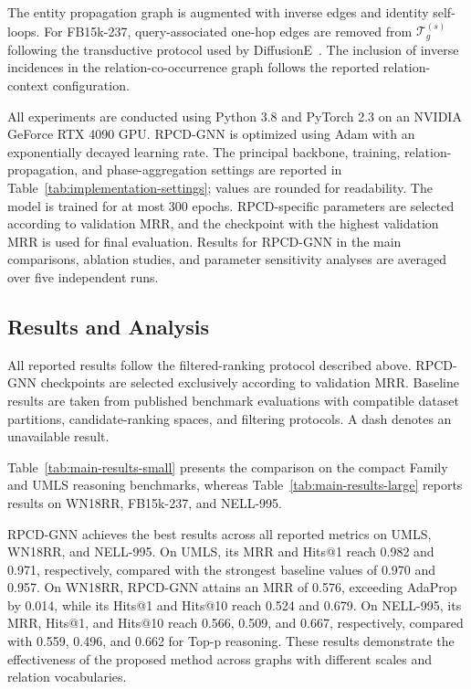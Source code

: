 \documentclass[a4paper,fleqn]{cas-dc}
\begin{document}
The entity propagation graph is augmented with inverse edges and identity self-loops. For FB15k-237, query-associated one-hop edges are removed from $\mathcal{T}_{g}^{(s)}$ following the transductive protocol used by DiffusionE~\citep{Cao2024DiffusionE}. The inclusion of inverse incidences in the relation-co-occurrence graph follows the reported relation-context configuration.

All experiments are conducted using Python 3.8 and PyTorch 2.3 on an NVIDIA GeForce RTX 4090 GPU. RPCD-GNN is optimized using Adam with an exponentially decayed learning rate. The principal backbone, training, relation-propagation, and phase-aggregation settings are reported in Table~\ref{tab:implementation-settings}; values are rounded for readability. The model is trained for at most 300 epochs. RPCD-specific parameters are selected according to validation MRR, and the checkpoint with the highest validation MRR is used for final evaluation. Results for RPCD-GNN in the main comparisons, ablation studies, and parameter sensitivity analyses are averaged over five independent runs.

\subsection{Results and Analysis}\label{subsec:results-analysis}

All reported results follow the filtered-ranking protocol described above. RPCD-GNN checkpoints are selected exclusively according to validation MRR. Baseline results are taken from published benchmark evaluations with compatible dataset partitions, candidate-ranking spaces, and filtering protocols. A dash denotes an unavailable result.

Table~\ref{tab:main-results-small} presents the comparison on the compact Family and UMLS reasoning benchmarks, whereas Table~\ref{tab:main-results-large} reports results on WN18RR, FB15k-237, and NELL-995.

RPCD-GNN achieves the best results across all reported metrics on UMLS, WN18RR, and NELL-995. On UMLS, its MRR and Hits@1 reach 0.982 and 0.971, respectively, compared with the strongest baseline values of 0.970 and 0.957. On WN18RR, RPCD-GNN attains an MRR of 0.576, exceeding AdaProp by 0.014, while its Hits@1 and Hits@10 reach 0.524 and 0.679. On NELL-995, its MRR, Hits@1, and Hits@10 reach 0.566, 0.509, and 0.667, respectively, compared with 0.559, 0.496, and 0.662 for Top-p reasoning. These results demonstrate the effectiveness of the proposed method across graphs with different scales and relation vocabularies.
\end{document}
